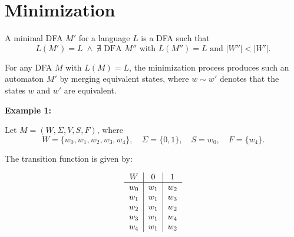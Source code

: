 \documentclass[12pt,a4paper,openany]{article}
\begin{document}
\begin{enumerate}
\end{enumerate}

\section{Minimization}

A minimal DFA $M'$ for a language $L$ is a DFA such that
\[
L(M') = L \;\land\; \nexists \text{ DFA } M'' \text{ with } L(M'') = L \text{ and } |W''| < |W'|.
\]

For any DFA $M$ with $L(M) = L$, the minimization process produces such an automaton $M'$ by merging equivalent states, where $w \sim w'$ denotes that the states $w$ and $w'$ are equivalent.

\textbf{Example 1:}

Let $M = (W, \Sigma, V, S, F)$, where
\[
W = \{w_0,w_1,w_2,w_3,w_4\}, \quad \Sigma = \{0,1\}, \quad S = w_0, \quad F = \{w_4\}.
\]

The transition function is given by:

\[
\begin{tabular}{c|c|c}
$W$ & $0$ & $1$ \\
\hline
$w_0$ & $w_1$ & $w_2$ \\
$w_1$ & $w_1$ & $w_3$ \\
$w_2$ & $w_1$ & $w_2$ \\
$w_3$ & $w_1$ & $w_4$ \\
$w_4$ & $w_1$ & $w_2$
\end{tabular}
\]

\begin{center}
\end{center}
\end{document}
